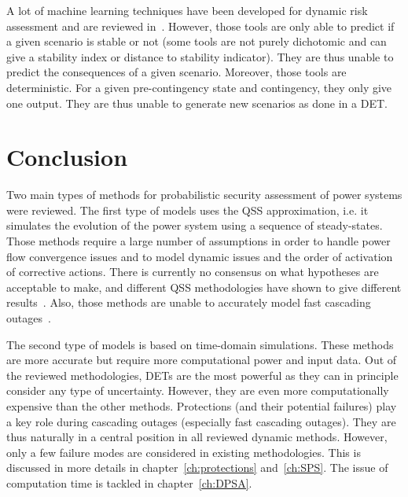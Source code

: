 
A lot of machine learning techniques have been developed for dynamic risk assessment and are reviewed in~\cite{MLEfthymios}. However, those tools are only able to predict if a given scenario is stable or not (some tools are not purely dichotomic and can give a stability index or distance to stability indicator). They are thus unable to predict the consequences of a given scenario. Moreover, those tools are deterministic. For a given pre-contingency state and contingency, they only give one output. They are thus unable to generate new scenarios as done in a DET. %


\section{Conclusion}
\label{sec:security-conclusions}

Two main types of methods for probabilistic security assessment of power systems were reviewed. The first type of models uses the QSS approximation, i.e. it simulates the evolution of the power system using a sequence of steady-states. Those methods require a large number of assumptions in order to handle power flow convergence issues and to model dynamic issues and the order of activation of corrective actions. There is currently no consensus on what hypotheses are acceptable to make, and different QSS methodologies have shown to give different results~\cite{Benchmarking2018}. Also, those methods are unable to accurately model fast cascading outages~\cite{BenchmarkingStaticVsDynamic}.

The second type of models is based on time-domain simulations. These methods are more accurate but require more computational power and input data. Out of the reviewed methodologies, DETs are the most powerful as they can in principle consider any type of uncertainty. However, they are even more computationally expensive than the other methods. Protections (and their potential failures) play a key role during cascading outages (especially fast cascading outages). They are thus naturally in a central position in all reviewed dynamic methods. However, only a few failure modes are considered in existing methodologies. This is discussed in more details in chapter~\ref{ch:protections} and~\ref{ch:SPS}. The issue of computation time is tackled in chapter~\ref{ch:DPSA}.


